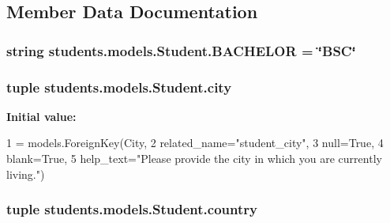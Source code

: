 \subsection{Member Data Documentation}
\hypertarget{classstudents_1_1models_1_1_student_a44c22f24f6430caa8c30a11cc2eda2f9}{
\subsubsection[{B\-A\-C\-H\-E\-L\-O\-R}]{\setlength{\rightskip}{0pt plus 5cm}string students.\-models.\-Student.\-B\-A\-C\-H\-E\-L\-O\-R = \char`\"{}B\-S\-C\char`\"{}\hspace{0.3cm}{\ttfamily [static]}}}\label{classstudents_1_1models_1_1_student_a44c22f24f6430caa8c30a11cc2eda2f9}
\hypertarget{classstudents_1_1models_1_1_student_ac237b28a8bc0d6f538fcfcb64f1bbede}{
\subsubsection[{city}]{\setlength{\rightskip}{0pt plus 5cm}tuple students.\-models.\-Student.\-city\hspace{0.3cm}{\ttfamily [static]}}}\label{classstudents_1_1models_1_1_student_ac237b28a8bc0d6f538fcfcb64f1bbede}
{\bfseries Initial value\-:}
\begin{DoxyCode}
1 = models.ForeignKey(City,
2                              related\_name=\textcolor{stringliteral}{"student\_city"},
3                              null=\textcolor{keyword}{True},
4                              blank=\textcolor{keyword}{True},
5                              help\_text=\textcolor{stringliteral}{"Please provide the city in which you are currently living."})
\end{DoxyCode}
\hypertarget{classstudents_1_1models_1_1_student_a03e45fddb9a4c1cd701ecf71ce750b55}{
\subsubsection[{country}]{\setlength{\rightskip}{0pt plus 5cm}tuple students.\-models.\-Student.\-country\hspace{0.3cm}{\ttfamily [static]}}}\label{classstudents_1_1models_1_1_student_a03e45fddb9a4c1cd701ecf71ce750b55}

